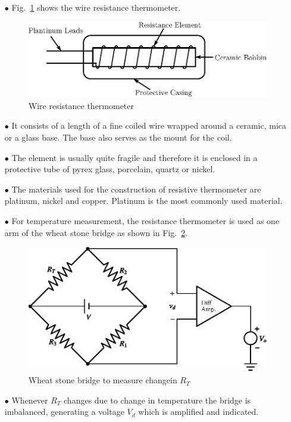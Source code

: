 \begin{itemize}
\itemsep=1pt
\item[$\bullet$] Fig.~\ref{fig8.8} shows the wire resistance thermometer.
\begin{figure}[H]
\centering
\includegraphics[scale=.85]{chap8/fig8.8.eps}
\caption{Wire resistance thermometer}\label{fig8.8}
\end{figure}

\item[$\bullet$] It consists of a length of a fine coiled wire wrapped around a ceramic, mica or a glass base. The base also serves as the mount for the coil.

\item[$\bullet$] The element is usually quite fragile and therefore it is enclosed in a protective tube of pyrex glass, porcelain, quartz or nickel. 

\item[$\bullet$] The materials used for the construction of resistive thermometer are platinum, nickel and copper. Platinum is the most commonly used material.

\item[$\bullet$] For temperature measurement, the resistance thermometer is used as one arm of the wheat stone bridge as shown in Fig.~\ref{fig8.9}.
\begin{figure}[H]
\centering
\includegraphics[scale=.8]{chap8/fig8.9.eps}
\caption{Wheat stone bridge to measure change\break in $R_{T}$}\label{fig8.9}
\end{figure}

\item[$\bullet$] Whenever $R_{T}$ changes due to change in temperature the bridge is imbalanced, generating a voltage $V_{d}$ which is amplified and indicated.
\end{itemize}

